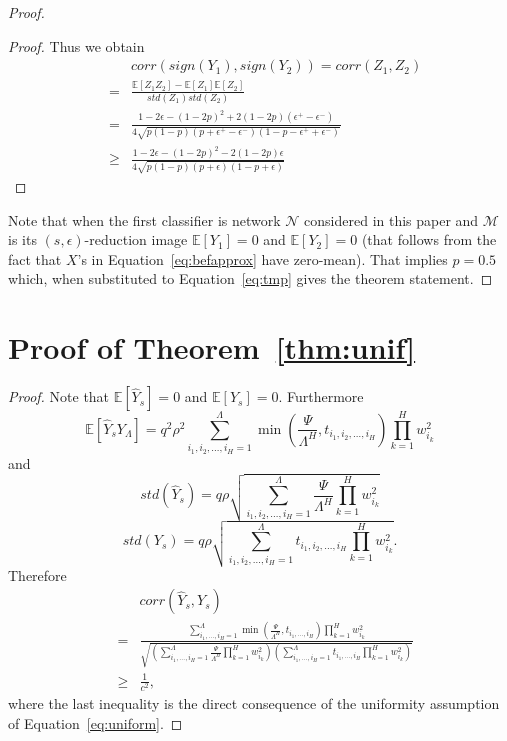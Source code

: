 \documentclass[twoside]{article}
\begin{document}
\begin{proof}
\begin{proof}
Thus we obtain
\begin{eqnarray}
&&\!\!\!\!\!\!\!\!\!\!\!\!\!\!\!corr(sign(Y_1),sign(Y_2)) = corr(Z_1,Z_2) \nonumber\\
&\!\!\!\!\!\!\!\!\!\!\!\!\!\!\!=& \!\!\!\!\!\!\!\!\!\!\frac{\mathbb{E}[Z_1Z_2] - \mathbb{E}[Z_1]\mathbb{E}[Z_2]}{std(Z_1)std(Z_2)} \nonumber\\
&\!\!\!\!\!\!\!\!\!\!\!\!\!\!\!=& \!\!\!\!\!\!\!\!\!\!\frac{1 - 2\epsilon - (1 - 2p)^2 + 2(1 - 2p)(\epsilon^{+} - \epsilon^{-})}{4\sqrt{p(1 - p)(p + \epsilon^{+} - \epsilon^{-})(1 - p - \epsilon^{+} + \epsilon^{-})}} \nonumber\\
&\!\!\!\!\!\!\!\!\!\!\!\!\!\!\!\geq& \!\!\!\!\!\!\!\!\!\!\frac{1 - 2\epsilon - (1 - 2p)^2 - 2(1 - 2p)\epsilon}{4\sqrt{p(1 - p)(p + \epsilon)(1 - p + \epsilon)}}
\label{eq:tmp}
\end{eqnarray}
\end{proof}
Note that when the first classifier is network $\mathcal{N}$ considered in this paper and $\mathcal{M}$ is its $(s,\epsilon)$-reduction image $\mathbb{E}[Y_1] = 0$ and $\mathbb{E}[Y_2] = 0$ (that follows from the fact that $X$'s in Equation~\ref{eq:befapprox} have zero-mean). That implies $p=0.5$ which, when substituted to Equation~\ref{eq:tmp} gives the theorem statement.
\end{proof}

\section{Proof of Theorem~\ref{thm:unif}}
\begin{proof}
Note that $\mathbb{E}[\hat{Y}_s] = 0$ and $\mathbb{E}[Y_s] = 0$. Furthermore
\[\mathbb{E}[\hat{Y}_sY_{\Lambda}] = q^2\rho^2\!\!\!\sum_{i_1,i_2,\dots,i_H=1}^{\Lambda}\!\!\!\min\left(\frac{\Psi}{\Lambda^H},t_{i_1,i_2,\dots,i_H}\right)\prod_{k = 1}^{H}w_{i_k}^2
\]
and
\[std(\hat{Y}_s) = q\rho\sqrt{\sum_{i_1,i_2,\dots,i_H=1}^{\Lambda}\frac{\Psi}{\Lambda^H}\prod_{k = 1}^{H}w_{i_k}^2}
\]
\[std(Y_s) = q\rho\sqrt{\sum_{i_1,i_2,\dots,i_H=1}^{\Lambda}t_{i_1,i_2,\dots,i_H}\prod_{k = 1}^{H}w_{i_k}^2}.
\]
Therefore
\begin{eqnarray*}
&&\!\!\!\!\!\!\!\!\!corr(\hat{Y}_s,Y_s)\\ 
&\!\!\!\!\!\!\!\!\!=&\!\!\!\!\!\!\! \frac{\displaystyle\sum_{i_1,\dots,i_H=1}^{\Lambda}\min\left(\frac{\Psi}{\Lambda^H},t_{i_1,\dots,i_H}\right)\prod_{k = 1}^{H}w_{i_k}^2}{\sqrt{\!\!\!\left(\displaystyle\sum_{i_1,\dots,i_H=1}^{\Lambda}\frac{\Psi}{\Lambda^H}\prod_{k = 1}^{H}w_{i_k}^2\right)\!\!\!\!\left(\displaystyle\sum_{i_1,\dots,i_H=1}^{\Lambda}\!\!\!\!\!t_{i_1,\dots,i_H}\prod_{k = 1}^{H}w_{i_k}^2\right)}}\\
&\!\!\!\!\!\!\!\!\geq& \frac{1}{c^2}, 
\end{eqnarray*}
where the last inequality is the direct consequence of the uniformity assumption of Equation~\ref{eq:uniform}.
\end{proof}
\end{document}
